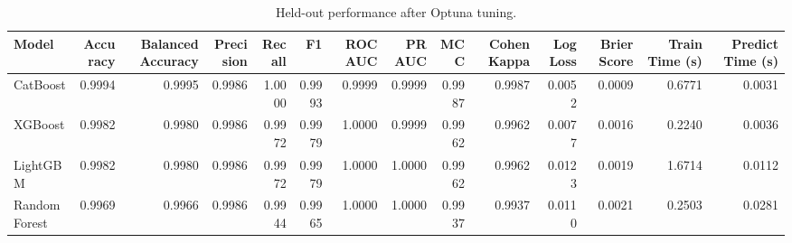 \begin{table}
\caption{Held-out performance after Optuna tuning.}
\label{tab:tuned}
\begin{tabular}{lrrrrrrrrrrrrr}
\toprule
Model & Accuracy & Balanced Accuracy & Precision & Recall & F1 & ROC AUC & PR AUC & MCC & Cohen Kappa & Log Loss & Brier Score & Train Time (s) & Predict Time (s) \\
\midrule
CatBoost & 0.9994 & 0.9995 & 0.9986 & 1.0000 & 0.9993 & 0.9999 & 0.9999 & 0.9987 & 0.9987 & 0.0052 & 0.0009 & 0.6771 & 0.0031 \\
XGBoost & 0.9982 & 0.9980 & 0.9986 & 0.9972 & 0.9979 & 1.0000 & 0.9999 & 0.9962 & 0.9962 & 0.0077 & 0.0016 & 0.2240 & 0.0036 \\
LightGBM & 0.9982 & 0.9980 & 0.9986 & 0.9972 & 0.9979 & 1.0000 & 1.0000 & 0.9962 & 0.9962 & 0.0123 & 0.0019 & 1.6714 & 0.0112 \\
Random Forest & 0.9969 & 0.9966 & 0.9986 & 0.9944 & 0.9965 & 1.0000 & 1.0000 & 0.9937 & 0.9937 & 0.0110 & 0.0021 & 0.2503 & 0.0281 \\
\bottomrule
\end{tabular}
\end{table}
